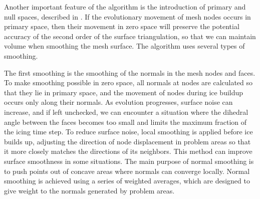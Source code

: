 \documentclass[
11pt,%
tightenlines,%
twoside,%
onecolumn,%
nofloats,%
nobibnotes,%
nofootinbib,%
superscriptaddress,%
noshowpacs,%
centertags]%
{revtex4-2}
\begin{document}
Another important feature of the algorithm is the introduction of primary and null spaces, described in \cite{Jiao_null_space_smooth}.
If the evolutionary movement of mesh nodes occurs in primary space, then their movement in zero space will preserve the potential accuracy of the second order of the surface triangulation, so that we can maintain volume when smoothing the mesh surface.
The algorithm uses several types of smoothing.

The first smoothing is the smoothing of the normals in the mesh nodes and faces.
To make smoothing possible in zero space, all normals at nodes are calculated so that they lie in primary space, and the movement of nodes during ice buildup occurs only along their normals.
As evolution progresses, surface noise can increase, and if left unchecked, we can encounter a situation where the dihedral angle between the faces becomes too small and limits the maximum fraction of the icing time step.
To reduce surface noise, local smoothing is applied before ice builds up, adjusting the direction of node displacement in problem areas so that it more closely matches the directions of its neighbors.
This method can improve surface smoothness in some situations.
The main purpose of normal smoothing is to push points out of concave areas where normals can converge locally.
Normal smoothing is achieved using a series of weighted averages, which are designed to give weight to the normals generated by problem areas.
\end{document}
